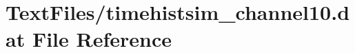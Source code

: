 \hypertarget{TextFiles_2timehistsim__channel10_8dat}{}\section{Text\+Files/timehistsim\+\_\+channel10.dat File Reference}
\label{TextFiles_2timehistsim__channel10_8dat}
